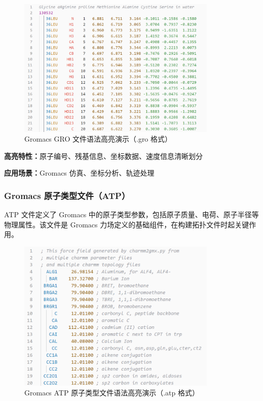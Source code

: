 \begin{figure}[!h]
    \centering
    \includegraphics[width=0.85\textwidth]{../images/gro.png}
    \caption{Gromacs GRO 文件语法高亮演示（.gro 格式）}
    \label{fig:gro-highlighting}
\end{figure}

\textbf{高亮特性：}原子编号、残基信息、坐标数据、速度信息清晰划分

\textbf{应用场景：}Gromacs 仿真、坐标分析、轨迹处理

\subsubsection{Gromacs 原子类型文件（ATP）}

ATP 文件定义了 Gromacs 中的原子类型参数，包括原子质量、电荷、原子半径等物理属性。该文件是 Gromacs 力场定义的基础组件，在构建拓扑文件时起关键作用。

\begin{figure}[!h]
    \centering
    \includegraphics[width=0.85\textwidth]{../images/atp.png}
    \caption{Gromacs ATP 原子类型文件语法高亮演示（.atp 格式）}
    \label{fig:atp-highlighting}
\end{figure}

